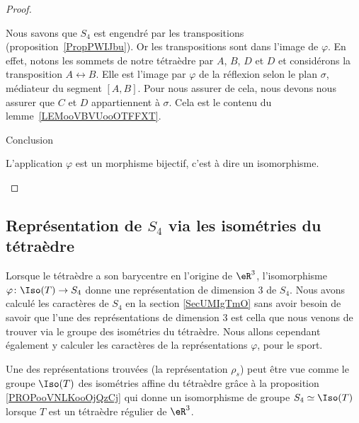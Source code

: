 \begin{proof}
\begin{subproof}
        Nous savons que \( S_4\) est engendré par les transpositions (proposition~\ref{PropPWIJbu}). Or les transpositions sont dans l'image de \( \varphi\). En effet, notons les sommets de notre tétraèdre par \( A\), \( B\), \( D\) et \( D\) et considérons la transposition \( A\leftrightarrow B\). Elle est l'image par \( \varphi\) de la réflexion selon le plan \( \sigma\), médiateur du segment \( [A,B]\). Pour nous assurer de cela, nous devons nous assurer que \( C\) et \( D\) appartiennent à \( \sigma\). Cela est le contenu du lemme~\ref{LEMooVBVUooOTFFXT}.

    \item[Conclusion]

        L'application \( \varphi\) est un morphisme bijectif, c'est à dire un isomorphisme.

    \end{subproof}
\end{proof}

\subsection{Représentation de \( S_4\) via les isométries du tétraèdre}
\label{SUBSECooVEASooDUbsBh}


\begin{normaltext}
    Lorsque le tétraèdre a son barycentre en l'origine de \( \eR^3\), l'isomorphisme \( \varphi\colon \Iso(T)\to S_4\) donne une représentation de dimension \( 3\) de \( S_4\). Nous avons calculé les caractères de \( S_4\) en la section \ref{SecUMIgTmO} sans avoir besoin de savoir que l'une des représentations de dimension \( 3\) est cella que nous venons de trouver via le groupe des isométries du tétraèdre. Nous allons cependant également y calculer les caractères de la représentations \( \varphi\), pour le sport.
\end{normaltext}

Une des représentations trouvées (la représentation \( \rho_s\)) peut être vue comme le groupe \( \Iso(T)\) des isométries affine du tétraèdre grâce à la proposition \ref{PROPooVNLKooOjQzCj} qui donne un isomorphisme de groupe \( S_4\simeq \Iso(T)\) lorsque \( T\) est un tétraèdre régulier de \( \eR^3\).

